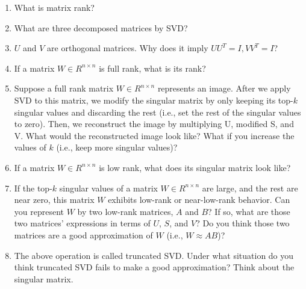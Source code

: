 \begin{enumerate}
    \item What is matrix rank?
    \item What are three decomposed matrices by SVD? 
    \item $U$ and $V$ are orthogonal matrices. Why does it imply $UU^T=I, VV^T=I$?
    \item If a matrix $W \in {R ^{n \times n}}$ is full rank, what is its rank?
    \item Suppose a full rank matrix $W \in {R ^{n \times n}}$ represents an image. After we apply SVD to this matrix, we modify the singular matrix by only keeping its top-$k$ singular values and discarding the rest (i.e., set the rest of the singular values to zero). Then, we reconstruct the image by multiplying U, modified S, and V. What would the reconstructed image look like? What if you increase the values of $k$ (i.e., keep more singular values)?
    \item If a matrix $W \in {R ^{n \times n}}$ is low rank, what does its singular matrix look like?
    \item If the top-$k$ singular values of a matrix $W \in {R ^{n \times n}}$ are large, and the rest are near zero, this matrix $W$ exhibits low-rank or near-low-rank behavior. Can you represent $W$ by two low-rank matrices, $A$ and $B$? If so, what are those two matrices' expressions in terms of $U$, $S$, and $V$? Do you think those two matrices are a good approximation of $W$ (i.e., $W \approx AB$)?
    \item The above operation is called truncated SVD. Under what situation do you think truncated SVD fails to make a good approximation? Think about the singular matrix.
\end{enumerate}

